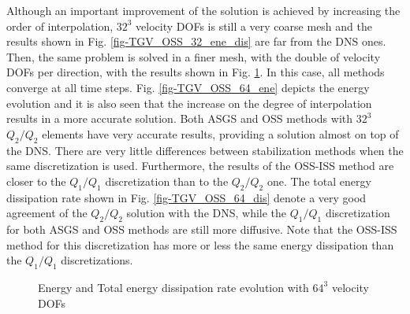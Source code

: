 Although an important improvement of the solution is achieved by increasing the order of interpolation, $32^3$ velocity DOFs is still a very coarse mesh and the results shown in Fig. \ref{fig-TGV_OSS_32_ene_dis} are far from the DNS ones. Then, the same problem is solved in a finer mesh, with the double of velocity DOFs per direction, with the results shown in Fig. \ref{fig-TGV_OSS_64_ene_dis}. In this case, all methods converge at all time steps. Fig. \ref{fig-TGV_OSS_64_ene} depicts the energy evolution and it is also seen that the increase on the degree of interpolation results in a more accurate solution. Both ASGS and OSS methods with $32^3$ $Q_2/Q_2$ elements have very accurate results, providing a solution almost on top of the DNS. There are very little differences between stabilization methods when the same discretization is used. Furthermore, the results of the OSS-ISS method are closer to the $Q_1/Q_1$ discretization than to the $Q_2/Q_2$ one. The total energy dissipation rate shown in Fig. \ref{fig-TGV_OSS_64_dis} denote a very good agreement of the $Q_2/Q_2$ solution with the DNS, while the $Q_1/Q_1$ discretization for both ASGS and OSS methods are still more diffusive. Note that the OSS-ISS method for this discretization has more or less the same energy dissipation than the $Q_1/Q_1$ discretizations.
\begin{figure}[h]
  \centering
  \caption{Energy and Total energy dissipation rate evolution with $64^3$ velocity DOFs}
  \label{fig-TGV_OSS_64_ene_dis}
\end{figure}

